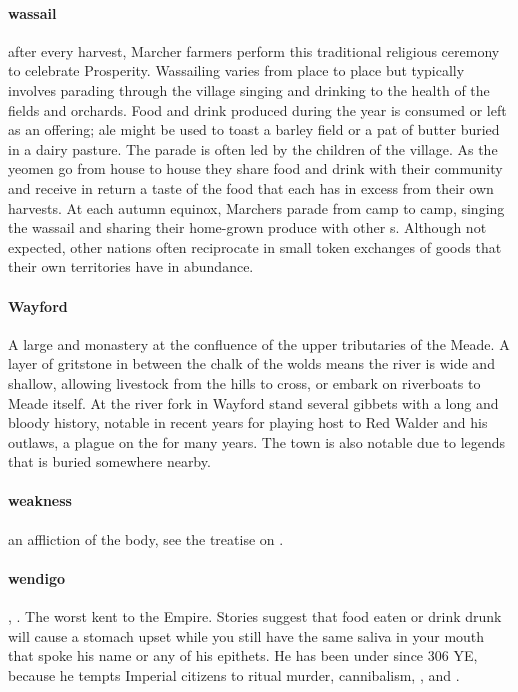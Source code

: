 \paragraph{wassail} after every harvest, Marcher farmers perform this traditional religious ceremony to celebrate Prosperity. Wassailing varies from place to place but typically involves parading through the village singing and drinking to the health of the fields and orchards. Food and drink produced during the year is consumed or left as an offering; ale might be used to toast a barley field or a pat of butter buried in a dairy pasture. The parade is often led by the children of the village. As the yeomen go from house to house they share food and drink with their community and receive in return a taste of the food that each  has in excess from their own harvests. At each autumn equinox, Marchers parade from camp to camp, singing the wassail and sharing their home-grown produce with other s. Although not expected, other nations often reciprocate in small token exchanges of goods that their own territories have in abundance.
\paragraph{Wayford} A large  and monastery at the confluence of the upper tributaries of the Meade. A layer of gritstone in between the chalk of the wolds means the river is wide and shallow, allowing livestock from the hills to cross, or embark on riverboats to Meade itself. At the river fork in Wayford stand several gibbets with a long and bloody history, notable in recent years for playing host to Red Walder and his outlaws, a plague on the  for many years. The town is also notable due to legends that  is buried somewhere nearby.
\paragraph{weakness} an affliction of the body, see the treatise on .
\paragraph{wendigo} , . The worst   kent to the Empire. Stories suggest that food eaten or drink drunk will cause a stomach upset while you still have the same saliva in your mouth that spoke his name or any of his epithets. He has been under  since 306 YE, because he tempts Imperial citizens to ritual murder, cannibalism, ,  and .
